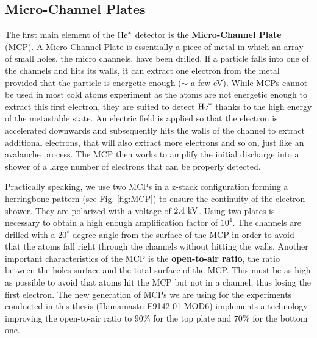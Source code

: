 \subsection{Micro-Channel Plates}

The first main element of the $\mathrm{He}^*$ detector is the \textbf{Micro-Channel Plate} (MCP). A Micro-Channel Plate is essentially a piece of metal in which an array of small holes, the micro channels, have been drilled. If a particle falls into one of the channels and hits its walls, it can extract one electron from the metal provided that the particle is energetic enough ($\sim$ a few eV). While MCPs cannot be used in most cold atoms experiment as the atoms are not energetic enough to extract this first electron, they are suited to detect $\mathrm{He}^*$ thanks to the high energy of the metastable state. An electric field is applied so that the electron is accelerated downwards and subsequently hits the walls of the channel to extract additional electrons, that will also extract more electrons and so on, just like an avalanche process. The MCP then works to amplify the initial discharge into a shower of a large number of electrons that can be properly detected. 

Practically speaking, we use two MCPs in a z-stack configuration forming a herringbone pattern (see Fig.-\ref{fig:MCP}) to ensure the continuity of the electron shower. They are polarized with a voltage of $2.4 \ \rm{kV}$. Using two plates is necessary to obtain a high enough amplification factor of $10^4$. The channels are drilled with a $20^{\circ}$ degree angle from the surface of the MCP in order to avoid that the atoms fall right through the channels without hitting the walls. Another important characteristics of the MCP is the \textbf{open-to-air ratio}, \ie the ratio between the holes surface and the total surface of the MCP. This must be as high as possible to avoid that atoms hit the MCP but not in a channel, thus losing the first electron. The new generation of MCPs we are using for the experiments conducted in this thesis (Hamamastu F9142-01 MOD6) implements a technology improving the open-to-air ratio to $90\%$ for the top plate and $70 \%$ for the bottom one.


